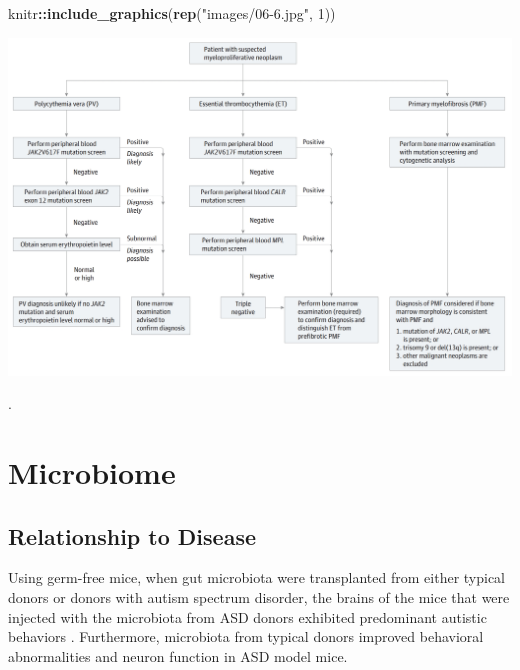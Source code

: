\documentclass[]{book}
\newenvironment{Shaded}{\begin{snugshade}}{\end{snugshade}}
\newcommand{\DataTypeTok}[1]{\textcolor[rgb]{0.13,0.29,0.53}{#1}}
\newcommand{\DecValTok}[1]{\textcolor[rgb]{0.00,0.00,0.81}{#1}}
\newcommand{\KeywordTok}[1]{\textcolor[rgb]{0.13,0.29,0.53}{\textbf{#1}}}
\newcommand{\NormalTok}[1]{#1}
\newcommand{\OperatorTok}[1]{\textcolor[rgb]{0.81,0.36,0.00}{\textbf{#1}}}
\newcommand{\OtherTok}[1]{\textcolor[rgb]{0.56,0.35,0.01}{#1}}
\newcommand{\StringTok}[1]{\textcolor[rgb]{0.31,0.60,0.02}{#1}}
\begin{document}
\begin{Shaded}
\begin{Highlighting}[]
\NormalTok{knitr}\OperatorTok{::}\KeywordTok{include_graphics}\NormalTok{(}\KeywordTok{rep}\NormalTok{(}\StringTok{"images/06-6.jpg"}\NormalTok{, }\DecValTok{1}\NormalTok{))          }
\end{Highlighting}
\end{Shaded}

\includegraphics{images/06-6.jpg}

\begin{Shaded}
\end{Shaded}

\citep{tefferi2015myeloproliferative}.

\hypertarget{microbiome}{%
\chapter{Microbiome}\label{microbiome}}

\hypertarget{relationship-to-disease}{%
\section{Relationship to Disease}\label{relationship-to-disease}}

Using germ-free mice, when gut microbiota were transplanted from either typical donors or donors with autism spectrum disorder, the brains of the mice that were injected with the microbiota from ASD donors exhibited predominant autistic behaviors \citep{sharon2019human}. Furthermore, microbiota from typical donors improved behavioral abnormalities and neuron function in ASD model mice.
\end{document}
